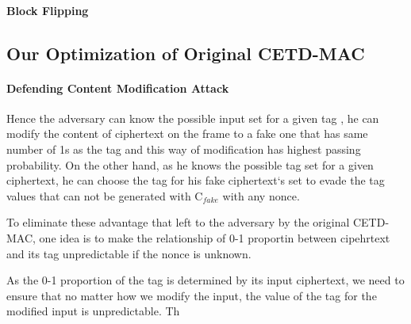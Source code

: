 \paragraph{Block Flipping}
\subsection{Our Optimization of Original CETD-MAC}
\paragraph{Defending Content Modification Attack}
Hence the adversary can know the possible input set for a given tag , he can modify the content of ciphertext on the frame to a fake one that has same number of 1s as the tag and this way of modification has highest passing probability. On the other hand, as he knows the possible tag set for a given ciphertext, he can choose the tag for his fake ciphertext`s set to evade the tag values that can not be generated with C$_{fake}$ with any nonce. 

To eliminate these advantage that left to the adversary by the original CETD-MAC, one idea is to make the relationship of 0-1 proportin between cipehrtext and its tag unpredictable if the nonce is unknown. 

As the 0-1 proportion of the tag is determined by its input ciphertext, we need to ensure that no matter how we modify the input, the value of the tag for the modified input is unpredictable. Th 

